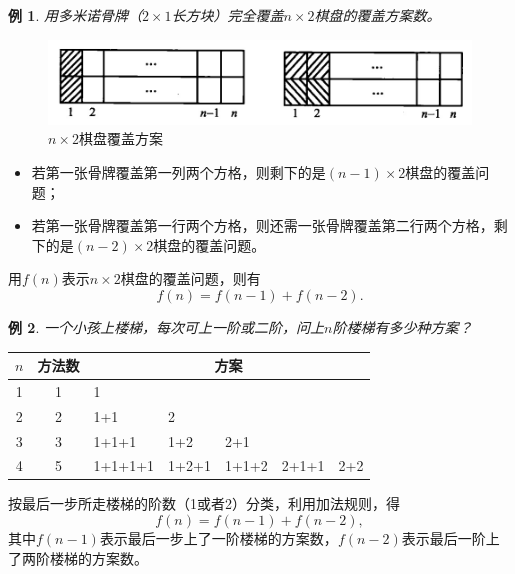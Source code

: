 \documentclass[punct]{ctexbeamer}
\newtheorem{ex}{例}[section]
\begin{document}
\begin{frame}
	\begin{ex}
		用多米诺骨牌（$2\times 1$长方块）完全覆盖$n\times 2$棋盘的覆盖方案数。
	\end{ex}
\pause \begin{figure}[h]
	\centering
	\includegraphics[width=0.8\linewidth]{domino.jpg}
	\caption{ $n\times 2$棋盘覆盖方案}
\end{figure}
\begin{itemize}
	\item 若第一张骨牌覆盖第一列两个方格，则剩下的是$(n-1)\times 2$棋盘的覆盖问题；
	\item 若第一张骨牌覆盖第一行两个方格，则还需一张骨牌覆盖第二行两个方格，剩下的是$(n-2)\times 2$棋盘的覆盖问题。
\end{itemize}
用$f(n)$表示$n\times 2$棋盘的覆盖问题，则有\[
f(n)=f(n-1)+f(n-2).
\]
\end{frame}


\begin{frame}
    \begin{ex}
        一个小孩上楼梯，每次可上一阶或二阶，问上$n$阶楼梯有多少种方案？
    \end{ex}
    \pause
    \begin{table}
        \begin{tabular}{c|c|lllll}
            $n$&方法数&\multicolumn{5}{c}{方案}\\\hline
            1&1	&1	&	&	&	&		\\
            2&2	&1+1	&2	&	&	& \\
            3&3	&1+1+1	&1+2	&2+1	&	&		\\
            4&5	&1+1+1+1	&1+2+1	&1+1+2	&2+1+1	&2+2
        \end{tabular}
    \end{table}
    按最后一步所走楼梯的阶数（1或者2）分类，利用加法规则，得
    \[
    f(n)=f(n-1)+f(n-2),
    \]其中$f(n-1)$表示最后一步上了一阶楼梯的方案数，$f(n-2)$表示最后一阶上了两阶楼梯的方案数。
\end{frame}
\end{document}
